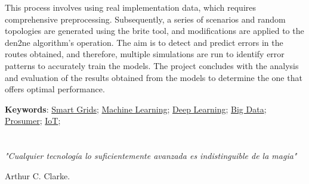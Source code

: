 \vspace{3mm}

This process involves using real implementation data, which requires comprehensive preprocessing. Subsequently, a series of scenarios and random topologies are generated using the \acrshort{brite} tool, and modifications are applied to the \acrshort{den2ne} algorithm's operation. The aim is to detect and predict errors in the routes obtained, and therefore, multiple simulations are run to identify error patterns to accurately train the models. The project concludes with the analysis and evaluation of the results obtained from the models to determine the one that offers optimal performance.

\vspace{1cm}

\textbf{Keywords}: 
\href{https://scholar.google.com/scholar?q=smartgrids}{Smart Grids}; 
\href{https://scholar.google.com/scholar?hl=es&as_sdt=0,5&q=machine+learning}{Machine Learning};
\href{https://scholar.google.com/scholar?hl=es&as_sdt=0%2C5&q=deep+learning&btnG=}{Deep Learning}; 
\href{https://scholar.google.com/scholar?hl=es&as_sdt=0%2C5&q=big+data&btnG=}{Big Data};
\href{https://scholar.google.com/scholar?hl=es&as_sdt=0%2C5&q=prosumer&btnG=}{Prosumer}; 
\href{https://scholar.google.com/scholar?hl=es&as_sdt=0%2C5&q=iot&btnG=}{IoT}; 

\cleardoublepage %



\chapter*{}
\setlength{\leftmargin}{0.5\textwidth}
\setlength{\parsep}{0cm}
\addtolength{\topsep}{0.5cm}
\begin{flushright}
	\small\em{
		"Cualquier tecnología lo suficientemente avanzada es indistinguible de la magia"
	}
\end{flushright}
\begin{flushright}
	\small{
		Arthur C. Clarke.
	}
\end{flushright}

\cleardoublepage %

